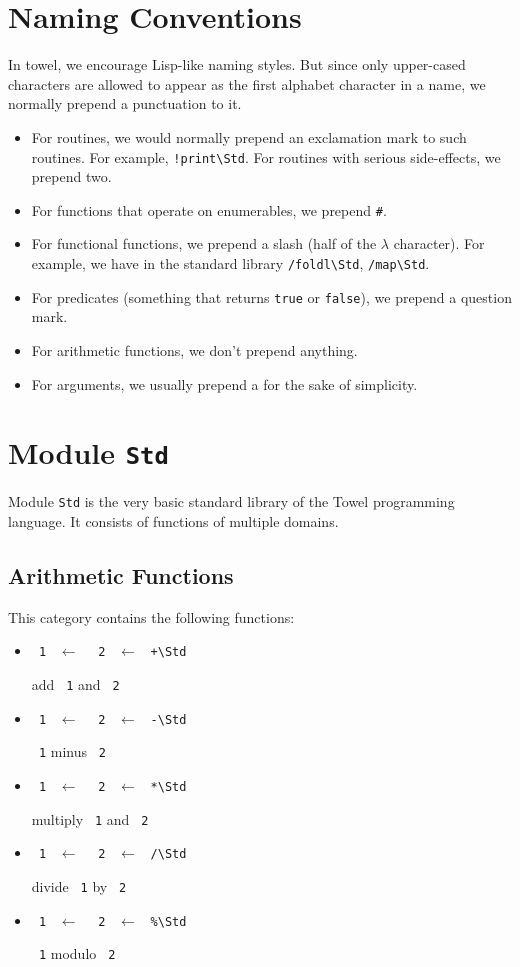 \documentclass{report}
\newcommand{\mstd}[1]{\texttt{#1\textbackslash Std}}
\newcommand{\mtilde}[1]{\textasciitilde}
\newcommand{\marg}[1]{\texttt{\mtilde ~#1}}
\newcommand{\mla}[0]{~$\leftarrow$ ~}
\newcommand{\arithstd}[1]{\marg{1} \mla \marg{2} \mla \mstd{#1}}
\begin{document}
\section{Naming Conventions}

In towel, we encourage Lisp-like naming styles. But since only upper-cased characters are allowed to appear as the first alphabet character in a name, we normally prepend a punctuation to it.

\begin{itemize}
\item For routines, we would normally prepend an exclamation mark to
  such routines. For example, \mstd{!print}. For routines with serious side-effects, we prepend two.

\item For functions that operate on enumerables, we prepend \texttt{\#}.

\item For functional functions, we prepend a slash (half of the $\lambda$ character). For example, we have in the standard library \mstd{/foldl}, \mstd{/map}.

\item For predicates (something that returns \texttt{true} or \texttt{false}), we prepend a question mark.

\item For arithmetic functions, we don't prepend anything.

\item For arguments, we usually prepend a \texttt{\mtilde} for the sake of simplicity.
\end{itemize}

\section{Module \texttt{Std}}

Module \texttt{Std} is the very basic standard library of the Towel programming language. It consists of functions of multiple domains.

\subsection{Arithmetic Functions}

This category contains the following functions:
\begin{itemize}
\item \arithstd{+}

add \marg1 and \marg2
\item \arithstd{-}

\marg1 minus \marg2
\item \arithstd{*}

multiply \marg1 and \marg2
\item \arithstd{/}

divide \marg1 by \marg2
\item \arithstd{\%}

\marg1 modulo \marg2
\end{itemize}
\end{document}
